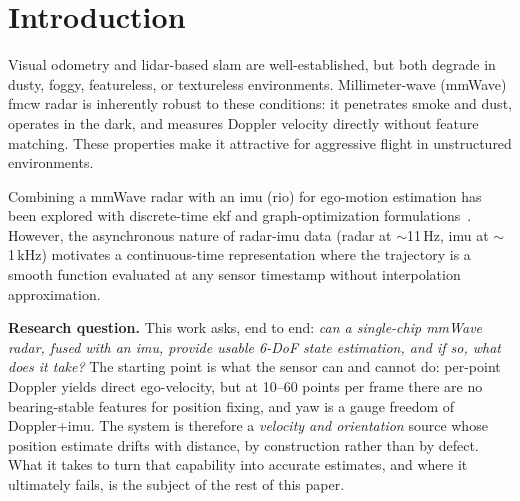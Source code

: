 \section{Introduction}
\label{sec:intro}

Visual odometry and \ac{lidar}-based \ac{slam} are well-established, but both
degrade in dusty, foggy, featureless, or textureless environments.
Millimeter-wave (mmWave) \ac{fmcw} radar is inherently robust to these
conditions: it penetrates smoke and dust, operates in the dark, and
measures Doppler velocity directly without feature matching.  These
properties make it attractive for aggressive flight in unstructured
environments.

Combining a mmWave radar with an \ac{imu} (\ac{rio}) for ego-motion estimation
has been explored with discrete-time \ac{ekf} and graph-optimization
formulations~\cite{doer2020ekf,kramer2020rve}.  However, the
asynchronous nature of radar-\ac{imu} data (radar at $\sim$11\,Hz, \ac{imu} at
$\sim$1\,kHz) motivates a continuous-time representation where the
trajectory is a smooth function evaluated at any sensor timestamp
without interpolation approximation.

\textbf{Research question.}
This work asks, end to end: \emph{can a single-chip mmWave radar,
fused with an \ac{imu}, provide usable 6-DoF state estimation, and if
so, what does it take?}  The starting point is what the sensor can and
cannot do: per-point Doppler yields direct ego-velocity, but at
10--60 points per frame there are no bearing-stable features for
position fixing, and yaw is a gauge freedom of Doppler+\ac{imu}.  The
system is therefore a \emph{velocity and orientation} source whose
position estimate drifts with distance, by construction rather than by
defect.  What it takes to turn that capability into accurate
estimates, and where it ultimately fails, is the subject of the rest
of this paper.

